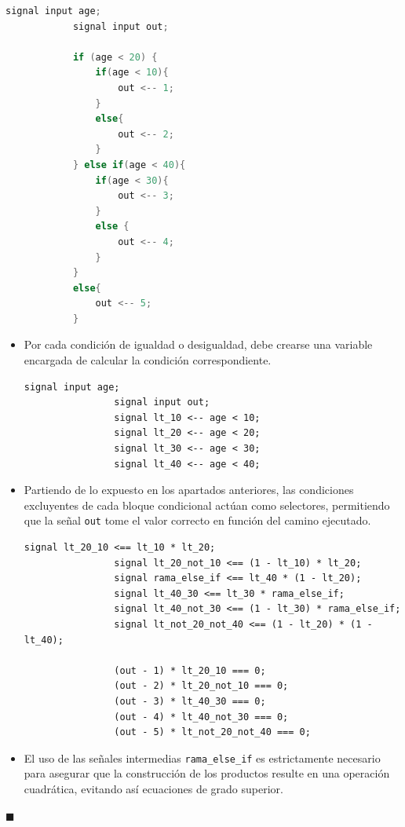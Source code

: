 \documentclass[a4paper,12pt]{report}
\begin{document}
	\begin{mi_ejemplo}
		
		\caption{Caso inductivo condicional}
		\label{ex:caso-inductivo-cond}
		\lstset{basicstyle=\footnotesize\ttfamily, aboveskip=1pt, belowskip=1pt}
		
		\begin{lstlisting}[language=C]
			signal input age;
			signal input out;
			
			if (age < 20) {
				if(age < 10){
					out <-- 1;
				}
				else{
					out <-- 2;
				}
			} else if(age < 40){
				if(age < 30){
					out <-- 3;
				}
				else {
					out <-- 4;
				}
			}
			else{
				out <-- 5;
			}
		\end{lstlisting}
		
		
		\begin{itemize}
			\item Por cada condición de igualdad o desigualdad, debe crearse una variable encargada de calcular la condición correspondiente.
			
			\begin{lstlisting}[language=Circom, breaklines=true]
				signal input age;
				signal input out;
				signal lt_10 <-- age < 10;
				signal lt_20 <-- age < 20;
				signal lt_30 <-- age < 30;
				signal lt_40 <-- age < 40;
			\end{lstlisting}
			
			\item Partiendo de lo expuesto en los apartados anteriores, las condiciones excluyentes de cada bloque condicional actúan como selectores, permitiendo que la señal \texttt{out} tome el valor correcto en función del camino ejecutado.
			
			\begin{lstlisting}[language=Circom, breaklines=true]
				signal lt_20_10 <== lt_10 * lt_20;
				signal lt_20_not_10 <== (1 - lt_10) * lt_20;
				signal rama_else_if <== lt_40 * (1 - lt_20);
				signal lt_40_30 <== lt_30 * rama_else_if;
				signal lt_40_not_30 <== (1 - lt_30) * rama_else_if;
				signal lt_not_20_not_40 <== (1 - lt_20) * (1 - lt_40);
				
				(out - 1) * lt_20_10 === 0;
				(out - 2) * lt_20_not_10 === 0;
				(out - 3) * lt_40_30 === 0;
				(out - 4) * lt_40_not_30 === 0;
				(out - 5) * lt_not_20_not_40 === 0;
			\end{lstlisting}
			
			\item El uso de las señales intermedias \texttt{rama\_else\_if} es estrictamente necesario para asegurar que la construcción de los productos resulte en una operación cuadrática, evitando así ecuaciones de grado superior.
			
		\end{itemize}
		\hspace*{\fill} $\blacksquare$
	\end{mi_ejemplo}
	
\end{document}
